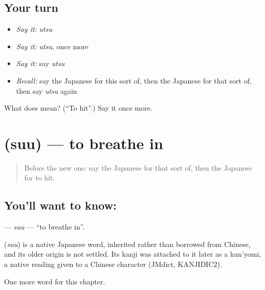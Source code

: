 \subsection*{Your turn}
\begin{itemize}
\raggedright
  \item \emph{Say it:} \emph{utsu}
  \item \emph{Say it:} \emph{utsu}, once more
  \item \emph{Say it:} say \emph{utsu}
  \item \emph{Recall:} say the Japanese for this sort of, then the Japanese for that sort of, then say \emph{utsu} again
\end{itemize}

\begin{tcolorbox}[breakable,colback=teal!4,colframe=teal!35!black,title={Before you move on}]
What does  mean? (\textquotedblleft{}To hit\textquotedblright{}.) Say it once more.
\end{tcolorbox}
\section[\texorpdfstring{\ja{すう} (suu)}{すう (suu)}]{ (suu) — to breathe in}

\label{lesson:JA-C85-suu}



\begin{quote}
Before the new one: say the Japanese for that sort of, then the Japanese for to hit.
\end{quote}

\subsection*{You'll want to know: }
\textbf{} — \emph{suu} — \textquotedblleft{}to breathe in\textquotedblright{}.

\begin{cousinweb}
\textbf{} (\emph{suu}) is a native Japanese word, inherited rather than borrowed from Chinese, and its older origin is not settled. Its kanji was attached to it later as a kun'yomi, a native reading given to a Chinese character (JMdict, KANJIDIC2).
\end{cousinweb}

\begin{grammarlens}[title={What you've built}]
One more word for this chapter.
\end{grammarlens}

